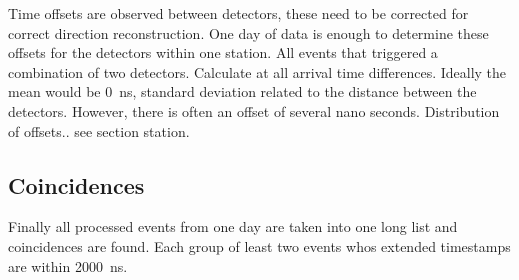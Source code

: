 Time offsets are observed between detectors, these need to be corrected for correct direction reconstruction. One day of data is enough to determine these offsets for the detectors within one station. All events that triggered a combination of two detectors. Calculate at all arrival time differences. Ideally the mean would be \SI{0}{\nano\second}, standard deviation related to the distance between the detectors. However, there is often an offset of several nano seconds. Distribution of offsets.. see section station. 


\subsection{Coincidences}

Finally all processed events from one day are taken into one long list and coincidences are found. Each group of least two events whos extended timestamps are within \SI{2000}{\nano\second}. 
